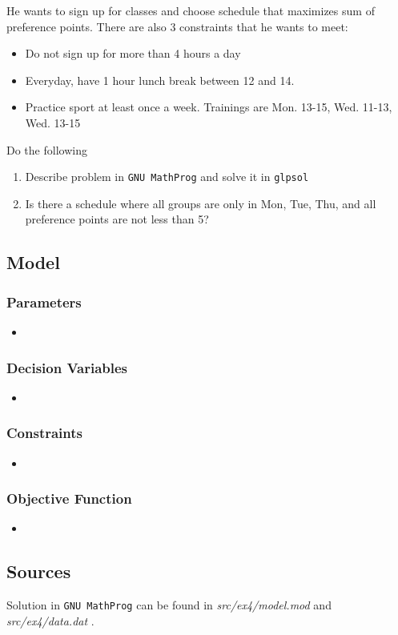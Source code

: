 He wants to sign up for classes and choose schedule that maximizes sum of preference points.
There are also 3 constraints that he wants to meet:
\begin{itemize}
    \item Do not sign up for more than 4 hours a day
    \item Everyday, have 1 hour lunch break between 12 and 14.
    \item Practice sport at least once a week. Trainings are Mon. 13-15, Wed. 11-13, Wed. 13-15
\end{itemize}

Do the following
\begin{enumerate}
    \item Describe problem in \texttt{GNU MathProg} and solve it in \texttt{glpsol} \notdone
    \item Is there a schedule where all groups are only in Mon, Tue, Thu, and all preference points are not less than 5? \notdone
\end{enumerate}
   
\subsection{Model}
\subsubsection*{Parameters}
\begin{itemize}
    \item 
\end{itemize}
\subsubsection*{Decision Variables}
\begin{itemize}
    \item 
\end{itemize}
\subsubsection*{Constraints}
\begin{itemize}
    \item 
\end{itemize}
\subsubsection*{Objective Function}
\begin{itemize}
    \item 
\end{itemize}
\subsection{Sources}
Solution in \texttt{GNU MathProg} can be found in \textit{src/ex4/model.mod} and \textit{src/ex4/data.dat} .
